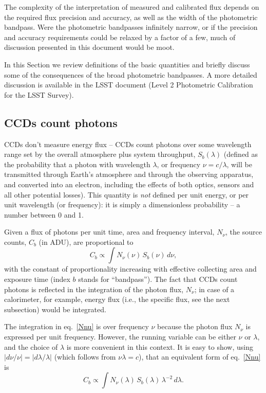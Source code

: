 \documentclass[PST,toc]{lsstdoc}
\begin{document}
The complexity of the interpretation of measured and calibrated flux depends on
the required flux precision and accuracy, as well as the width of the photometric bandpass.
Were the photometric bandpasses infinitely narrow, or if the precision and accuracy
requirements could be relaxed by a factor of a few, much of discussion presented in this
document would be moot.

In this Section we review definitions of the basic quantities and briefly discuss some of the
consequences of the broad photometric bandpasses. A more detailed discussion is
available in the LSST document  (Level 2 Photometric Calibration for the LSST Survey).


\subsection{CCDs count photons}

CCDs don't measure energy flux -- CCDs count photons over some wavelength range set
by the overall atmosphere plus system throughput,  $S_b(\lambda)$ (defined as the probability
that a photon with wavelength $\lambda$, or frequency $\nu=c/\lambda$,  will be
transmitted through Earth's atmosphere and through the observing apparatus, and converted
into an electron, including the effects of both optics, sensors and all other potential losses).
This quantity is \textit{not}  defined per unit energy, or per unit wavelength (or frequency):
it is simply a dimensionless probability -- a number between 0 and 1.

Given a flux of photons per unit time, area and frequency interval, $N_\nu$, the
source counts, $C_b$ (in ADU), are proportional to
\begin{equation}
\label{Nnu}
        C_b \propto \int N_\nu(\nu) \, S_b(\nu) \, d\nu,
\end{equation}
with the constant of proportionality increasing with effective collecting area and exposure
time (index $b$ stands for ``bandpass''). The fact that CCDs count photons is reflected in
the integration of the photon flux, $N_\nu$; in case of a calorimeter, for example, energy
flux (i.e., the specific flux, see the next subsection) would be integrated.

The integration in eq.~\ref{Nnu} is over frequency $\nu$ because the photon flux $N_\nu$
is expressed per unit frequency. However, the running variable can be either  $\nu$ or
$\lambda$, and the choice of $\lambda$ is more convenient in this context. It is
easy to show, using $|d\nu/\nu| = |d\lambda / \lambda|$ (which follows from $\nu \lambda=c$),
that an equivalent form of  eq.~\ref{Nnu} is
\begin{equation}
\label{Nnu2}
         C_b\propto \int N_\nu(\lambda) \, S_b(\lambda) \, \lambda^{-2} \, d\lambda.
\end{equation}
\end{document}
